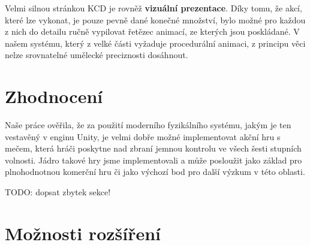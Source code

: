 Velmi silnou stránkou \acl{KCD} je rovněž \textbf{vizuální prezentace}. Díky tomu, že akcí, které lze vykonat, je pouze pevně dané konečné množství, bylo možné pro každou z nich do detailu ručně vypilovat řetězec animací, ze kterých jsou poskládané. V našem systému, který z velké části vyžaduje procedurální animaci, z principu věci nelze srovnatelné umělecké preciznosti dosáhnout. 


\section{Zhodnocení}

Naše práce ověřila, že za použití moderního fyzikálního systému, jakým je ten vestavěný v enginu Unity, je velmi dobře možné implementovat akční hru s mečem, která hráči poskytne nad zbraní jemnou kontrolu ve všech šesti stupních volnosti. Jádro takové hry jsme implementovali a může posloužit jako základ pro plnohodnotnou komerční hru či jako výchozí bod pro další výzkum v této oblasti.


TODO: dopsat zbytek sekce!

\section{Možnosti rozšíření}

